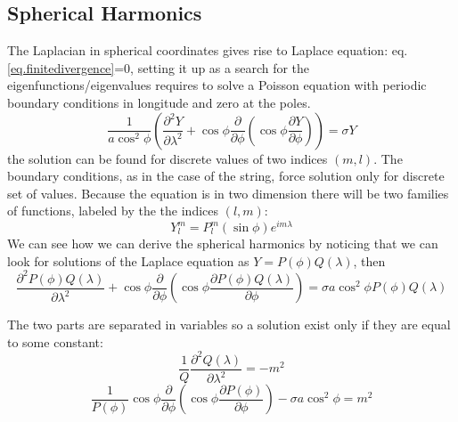 \subsection{Spherical Harmonics}
The Laplacian in spherical coordinates gives rise to Laplace equation: eq.\ref{eq.finitedivergence}=0, setting it up as a search for the eigenfunctions/eigenvalues requires to solve a Poisson equation with periodic boundary conditions in longitude and zero at the poles.
\begin{equation}\label{eq.sphericalhar}
	\frac{1}{a\cos^2\phi}\left(\frac{\partial^2Y}{\partial\lambda^2}+\cos\phi\frac{\partial}{\partial\phi}\left(\cos\phi\frac{\partial Y}{\partial\phi}\right)\right)=\sigma Y
\end{equation}
the solution can be found for discrete values of two indices $(m,l)$.
The boundary conditions, as in the case of the string, force solution only for
discrete set of values. Because the equation is in two dimension there will
be two families of functions, labeled by the the indices $(l,m)$:
\begin{equation}
	Y_l^m=P_l^m(\sin\phi)e^{im\lambda}
\end{equation}
We can see how we can derive the spherical harmonics by noticing that we can look for solutions of the Laplace equation as $Y=P(\phi)Q(\lambda)$, then
$$\frac{\partial^2P(\phi)Q(\lambda)}{\partial\lambda^2}+\cos\phi\frac{\partial}{\partial\phi}\left(\cos\phi\frac{\partial P(\phi)Q(\lambda)}{\partial\phi}\right)=\sigma a\cos^2\phi P(\phi)Q(\lambda)$$


The two parts are separated in variables so a solution exist
only if they are equal to some constant:
$$\frac{1}{Q}\frac{\partial^2Q(\lambda)}{\partial\lambda^2}=-m^2$$
$$\frac{1}{P(\phi)}\cos\phi\frac{\partial}{\partial\phi}\left(\cos\phi\frac{\partial P(\phi)}{\partial\phi}\right)-\sigma a\cos^2\phi=m^2$$

